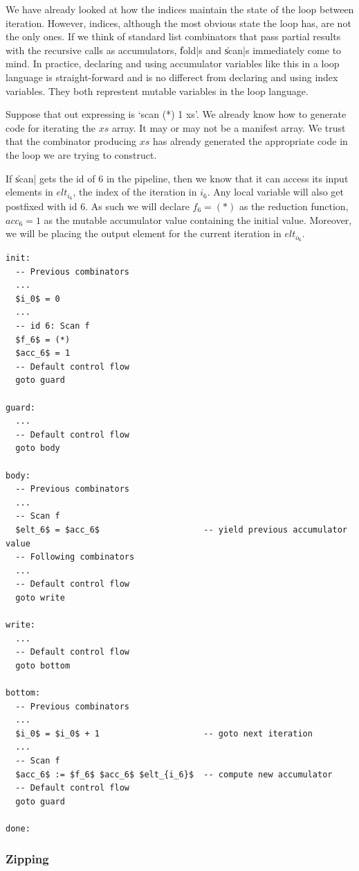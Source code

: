 \documentclass[preamble.tex]{subfiles}
\begin{document}
We have already looked at how the indices maintain the state of the loop between iteration. However, indices, although the most obvious state the loop has, are not the only ones. If we think of standard list combinators that pass partial results with the recursive calls as accumulators, \|fold|s and \|scan|s immediately come to mind. In practice, declaring and using accumulator variables like this in a loop language is straight-forward and is no differect from declaring and using index variables. They both represtent mutable variables in the loop language.

Suppose that out expressing is `scan (*) 1 xs'. We already know how to generate code for iterating the $xs$ array. It may or may not be a manifest array. We trust that the combinator producing $xs$ has already generated the appropriate code in the loop we are trying to construct.

If \|scan| gets the id of 6 in the pipeline, then we know that it can access its input elements in $elt_{i_6}$, the index of the iteration in $i_6$. Any local variable will also get postfixed with id 6. As such we will declare $f_6 = (*)$ as the reduction function, $acc_6 = 1$ as the mutable accumulator value containing the initial value. Moreover, we will be placing the output element for the current iteration in $elt_{o_6}$.

\begin{lstlisting}[mathescape]
init:
  -- Previous combinators
  ...
  $i_0$ = 0
  ...
  -- id 6: Scan f
  $f_6$ = (*)
  $acc_6$ = 1
  -- Default control flow
  goto guard

guard:
  ...
  -- Default control flow
  goto body

body:
  -- Previous combinators
  ...
  -- Scan f
  $elt_6$ = $acc_6$                     -- yield previous accumulator value
  -- Following combinators
  ...
  -- Default control flow
  goto write

write:
  ...
  -- Default control flow
  goto bottom

bottom:
  -- Previous combinators
  ...
  $i_0$ = $i_0$ + 1                     -- goto next iteration
  ...
  -- Scan f
  $acc_6$ := $f_6$ $acc_6$ $elt_{i_6}$  -- compute new accumulator
  -- Default control flow
  goto guard

done:

\end{lstlisting}

\subsubsection{Zipping}
\end{document}
